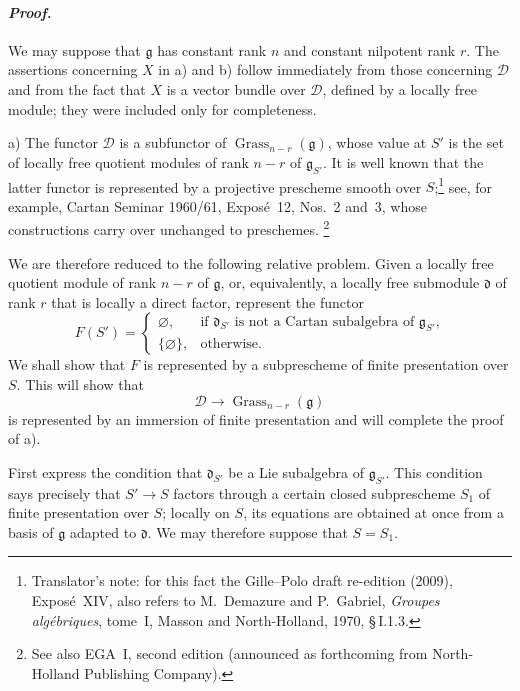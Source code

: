 
\paragraph{\textit{Proof.}}
We may suppose that \(\mathfrak g\) has constant rank \(n\) and
constant nilpotent rank \(r\). The assertions concerning \(X\) in
\textup{a)} and \textup{b)} follow immediately from those concerning
\(\mathcal D\) and from the fact that \(X\) is a vector bundle over
\(\mathcal D\), defined by a locally free module; they were included
only for completeness.

\medskip
\noindent\textup{a)}
The functor \(\mathcal D\) is a subfunctor of
\(\operatorname{Grass}_{n-r}(\mathfrak g)\), whose value at \(S'\)
is the set of locally free quotient modules of rank \(n-r\) of
\(\mathfrak g_{S'}\). It is well known that the latter functor is
represented by a projective prescheme smooth over \(S\);\footnote{Translator's note: for this fact the Gille--Polo draft re-edition (2009), Exposé~XIV, also refers to M.~Demazure and P.~Gabriel, \emph{Groupes algébriques}, tome~I, Masson and North-Holland, 1970, \S\,I.1.3.} see, for
example, Cartan Seminar 1960/61, Exposé~12, Nos.~2 and~3, whose
constructions carry over unchanged to preschemes.\begingroup
\renewcommand{\thefootnote}{*}\footnote{See also EGA~I, second
edition \textup{(announced as forthcoming from North-Holland
Publishing Company)}.}
\endgroup

We are therefore reduced to the following relative problem. Given
a locally free quotient module of rank \(n-r\) of \(\mathfrak g\),
or, equivalently, a locally free submodule \(\mathfrak d\) of rank
\(r\) that is locally a direct factor, represent the functor
\[
 F(S')=
 \begin{cases}
   \varnothing,
     &\text{if \(\mathfrak d_{S'}\) is not a Cartan subalgebra of
       \(\mathfrak g_{S'}\),}\\
   \{\varnothing\},
     &\text{otherwise.}
 \end{cases}
\]
We shall show that \(F\) is represented by a subprescheme of finite
presentation over \(S\). This will show that
\[
  \mathcal D\longrightarrow
  \operatorname{Grass}_{n-r}(\mathfrak g)
\]
is represented by an immersion of finite presentation and will
complete the proof of \textup{a)}.

First express the condition that \(\mathfrak d_{S'}\) be a Lie
subalgebra of \(\mathfrak g_{S'}\). This condition says precisely
that \(S'\to S\) factors through a certain closed subprescheme
\(S_1\) of finite presentation over \(S\); locally on \(S\), its
equations are obtained at once from a basis of \(\mathfrak g\)
adapted to \(\mathfrak d\). We may therefore suppose that
\(S=S_1\).

